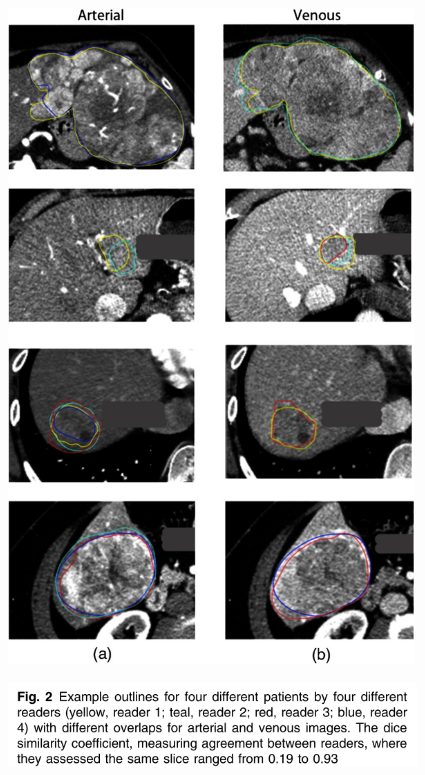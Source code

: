 \documentclass[]{article}
\begin{document}
\includegraphics[width=4.22775in,height=6.83726in]{./images/image14.png}

\includegraphics[width=4.26141in,height=0.87100in]{./images/image9.png}
\end{document}
